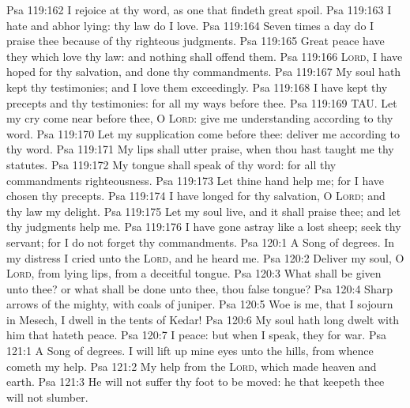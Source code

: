 \vs Psa 119:162 I rejoice at thy word, as one that findeth great spoil.
\vs Psa 119:163 I hate and abhor lying:  thy law do I love.
\vs Psa 119:164 Seven times a day do I praise thee because of thy righteous judgments.
\vs Psa 119:165 Great peace have they which love thy law: and nothing shall offend them.
\vs Psa 119:166 \textsc{Lord}, I have hoped for thy salvation, and done thy commandments.
\vs Psa 119:167 My soul hath kept thy testimonies; and I love them exceedingly.
\vs Psa 119:168 I have kept thy precepts and thy testimonies: for all my ways  before thee.
\vs Psa 119:169 TAU. Let my cry come near before thee, O \textsc{Lord}: give me understanding according to thy word.
\vs Psa 119:170 Let my supplication come before thee: deliver me according to thy word.
\vs Psa 119:171 My lips shall utter praise, when thou hast taught me thy statutes.
\vs Psa 119:172 My tongue shall speak of thy word: for all thy commandments  righteousness.
\vs Psa 119:173 Let thine hand help me; for I have chosen thy precepts.
\vs Psa 119:174 I have longed for thy salvation, O \textsc{Lord}; and thy law  my delight.
\vs Psa 119:175 Let my soul live, and it shall praise thee; and let thy judgments help me.
\vs Psa 119:176 I have gone astray like a lost sheep; seek thy servant; for I do not forget thy commandments.
\vs Psa 120:1 A Song of degrees. In my distress I cried unto the \textsc{Lord}, and he heard me.
\vs Psa 120:2 Deliver my soul, O \textsc{Lord}, from lying lips,  from a deceitful tongue.
\vs Psa 120:3 What shall be given unto thee? or what shall be done unto thee, thou false tongue?
\vs Psa 120:4 Sharp arrows of the mighty, with coals of juniper.
\vs Psa 120:5 Woe is me, that I sojourn in Mesech,  I dwell in the tents of Kedar!
\vs Psa 120:6 My soul hath long dwelt with him that hateth peace.
\vs Psa 120:7 I  peace: but when I speak, they  for war.
\vs Psa 121:1 A Song of degrees. I will lift up mine eyes unto the hills, from whence cometh my help.
\vs Psa 121:2 My help  from the \textsc{Lord}, which made heaven and earth.
\vs Psa 121:3 He will not suffer thy foot to be moved: he that keepeth thee will not slumber.
